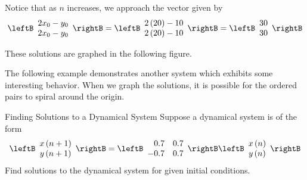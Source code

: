 \begin{solution}
Notice that as $n$ increases, we approach the vector given by  
\begin{equation*}
\leftB
\begin{array}{c}
2x_{0}-y_{0} \\
2x_{0}-y_{0}
\end{array}
\rightB
=
\leftB
\begin{array}{r}
2\left(20\right)- 10\\
2\left( 20 \right)-10
\end{array}
\rightB
=
\leftB
\begin{array}{r}
30\\
30
\end{array}
\rightB
\end{equation*}

These solutions are graphed in the following figure. 

\begin{center}
\end{center}

\end{solution}

The following example demonstrates another system which exhibits some interesting behavior. When we graph 
the solutions, it is
possible for the ordered pairs to spiral around the origin.

\begin{example}{Finding Solutions to a Dynamical System}\label{exa:findsolutionsdynamicalsystem}
Suppose a dynamical system is of the form
\begin{equation*}
\leftB
\begin{array}{c}
x\left( n+1\right) \\
y\left( n+1\right)
\end{array}
\rightB =\leftB 
\begin{array}{rr}
0.7 & 0.7 \\
-0.7 & 0.7
\end{array}
\rightB \leftB
\begin{array}{c}
x\left( n\right) \\
y\left( n\right)
\end{array}
\rightB
\end{equation*}
Find solutions to the dynamical system for given initial conditions.
\end{example}

